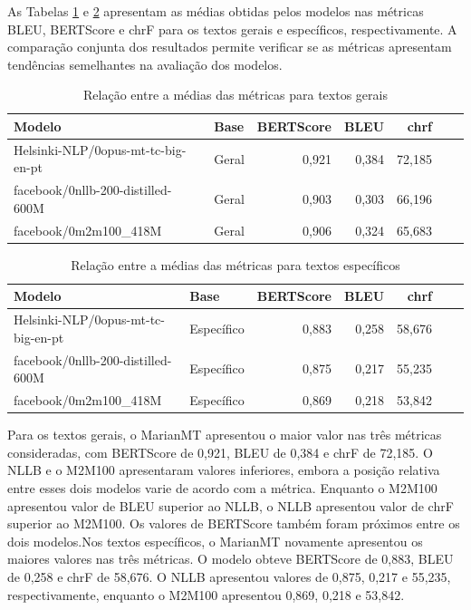 As Tabelas \ref{table-metrics-general} e \ref{table-metrics-specific} apresentam as médias obtidas pelos modelos nas métricas BLEU, BERTScore e chrF para os textos gerais e específicos, respectivamente. A comparação conjunta dos resultados permite verificar se as métricas apresentam tendências semelhantes na avaliação dos modelos.

\begin{table}[htbp]
  \centering
  \caption{Relação entre a médias das métricas para textos gerais}
  \vspace{0.5em}
  \label{table-metrics-general}
  \setlength{\tabcolsep}{3pt}
  \begin{tabularx}{\textwidth}{>{\raggedright\arraybackslash}X l r r r r r}
    \toprule
    \textbf{Modelo} & \textbf{Base} & \textbf{BERTScore} & \textbf{BLEU} & \textbf{chrf} \\
    \midrule
    Helsinki-NLP/\penalty0opus-mt-tc-big-en-pt & Geral & 0,921 & 0,384 & 72,185 \\
    \addlinespace
    facebook/\penalty0nllb-200-distilled-600M & Geral & 0,903 & 0,303 &  66,196 \\
    \addlinespace
    facebook/\penalty0m2m100\_418M & Geral & 0,906 & 0,324 & 65,683 \\
    \bottomrule
  \end{tabularx}
\end{table}


\begin{table}[htbp]
  \centering
  \caption{Relação entre a médias das métricas para textos específicos}
  \vspace{0.5em}
  \label{table-metrics-specific}
  \setlength{\tabcolsep}{3pt}
  \begin{tabularx}{\textwidth}{>{\raggedright\arraybackslash}X l r r r r r}
    \toprule
    \textbf{Modelo} & \textbf{Base} & \textbf{BERTScore} & \textbf{BLEU} & \textbf{chrf} \\
    \midrule
    Helsinki-NLP/\penalty0opus-mt-tc-big-en-pt & Específico & 0,883 &  0,258 & 58,676 \\
    \addlinespace
    facebook/\penalty0nllb-200-distilled-600M & Específico & 0,875 & 0,217 &  55,235 \\
    \addlinespace
    facebook/\penalty0m2m100\_418M & Específico &  0,869 & 0,218 & 53,842 \\
    \bottomrule
  \end{tabularx}
\end{table}

Para os textos gerais, o MarianMT apresentou o maior valor nas três métricas consideradas, com BERTScore de 0,921, BLEU de 0,384 e chrF de 72,185. O NLLB e o M2M100 apresentaram valores inferiores, embora a posição relativa entre esses dois modelos varie de acordo com a métrica. Enquanto o M2M100 apresentou valor de BLEU superior ao NLLB, o NLLB apresentou valor de chrF superior ao M2M100. Os valores de BERTScore também foram próximos entre os dois modelos.Nos textos específicos, o MarianMT novamente apresentou os maiores valores nas três métricas. O modelo obteve BERTScore de 0,883, BLEU de 0,258 e chrF de 58,676. O NLLB apresentou valores de 0,875, 0,217 e 55,235, respectivamente, enquanto o M2M100 apresentou 0,869, 0,218 e 53,842.


